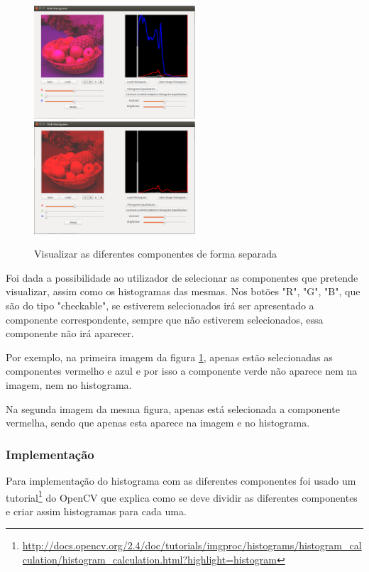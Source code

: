 \documentclass[pdftex,12pt,a4paper]{report}
\begin{document}
\begin{figure}[!htb]
\center
 \includegraphics[width=60mm,scale=1]{imagens/without_green.png}
 \includegraphics[width=60mm,scale=1]{imagens/only_red.png}
 \caption{Visualizar as diferentes componentes de forma separada}
 \label{fig:select_components}
\end{figure}

Foi dada a possibilidade ao utilizador de selecionar as componentes que pretende visualizar, assim como os histogramas das mesmas. Nos botões "R", "G", "B", que são do tipo "checkable", se estiverem selecionados irá ser apresentado a componente correspondente, sempre que não estiverem selecionados, essa componente não irá aparecer.

Por exemplo, na primeira imagem da figura \ref{fig:select_components}, apenas estão selecionadas as componentes vermelho e azul e por isso a componente verde não aparece nem na imagem, nem no histograma.

Na segunda imagem da mesma figura, apenas está selecionada a componente vermelha, sendo que apenas esta aparece na imagem e no histograma.

\subsubsection{Implementação}
Para implementação do histograma com as diferentes componentes foi usado um tutorial\footnote{\label{url2} \url{http://docs.opencv.org/2.4/doc/tutorials/imgproc/histograms/histogram_calculation/histogram_calculation.html?highlight=histogram}} do OpenCV que explica como se deve dividir as diferentes componentes e criar assim histogramas para cada uma.
\end{document}
